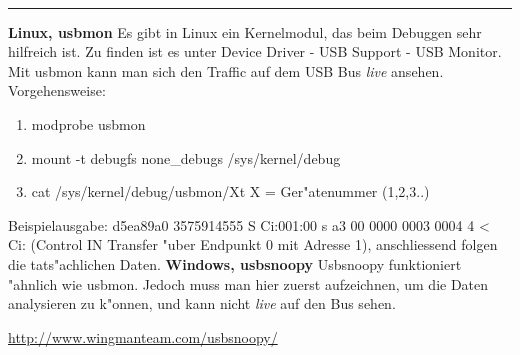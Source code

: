 \documentclass[11pt]{article}
\begin{document}
\begin{minipage}[t]{7cm}
\hfill {\Large{}}\\
\hrule

\medskip


\textbf{Linux, usbmon}
	\newline
	Es gibt in Linux ein Kernelmodul, das beim Debuggen sehr
	hilfreich ist. Zu finden ist es unter Device Driver - USB Support - USB Monitor.
	Mit usbmon kann man sich den Traffic auf dem USB Bus \textit{live} ansehen.
	\newline
	Vorgehensweise:
		\begin{enumerate}
			\item modprobe usbmon 
			\item mount -t debugfs none\_debugs /sys/kernel/debug
			\item  cat /sys/kernel/debug/usbmon/Xt X = Ger"atenummer (1,2,3..)
		\end{enumerate}
	Beispielausgabe:
		d5ea89a0 3575914555 S Ci:001:00 s a3 00 0000 0003 0004 4 <
	\newline
	Ci: (Control IN Transfer "uber Endpunkt 0 mit Adresse 1), 
	anschliessend folgen die tats"achlichen Daten.
	\newline
	\newline
\textbf{Windows, usbsnoopy}
	\newline
	Usbsnoopy funktioniert "ahnlich wie usbmon. Jedoch muss man hier
	zuerst aufzeichnen, um die Daten analysieren zu k"onnen, und kann
	nicht \textit{live} auf den Bus sehen.

	\begin{center}
      \url{http://www.wingmanteam.com/usbsnoopy/}
\end{center}



\end{minipage}
\hskip 12mm
\hskip 12mm
\end{document}

